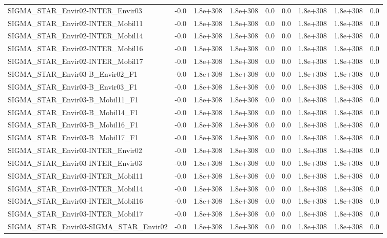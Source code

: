 \begin{tabular}{lrrrrrrrr}
SIGMA_STAR_Envir02-INTER_Envir03 & -0.0 & 1.8e+308 & 1.8e+308 & 0.0 & 0.0 & 1.8e+308 & 1.8e+308 & 0.0 \\
SIGMA_STAR_Envir02-INTER_Mobil11 & -0.0 & 1.8e+308 & 1.8e+308 & 0.0 & 0.0 & 1.8e+308 & 1.8e+308 & 0.0 \\
SIGMA_STAR_Envir02-INTER_Mobil14 & -0.0 & 1.8e+308 & 1.8e+308 & 0.0 & 0.0 & 1.8e+308 & 1.8e+308 & 0.0 \\
SIGMA_STAR_Envir02-INTER_Mobil16 & -0.0 & 1.8e+308 & 1.8e+308 & 0.0 & 0.0 & 1.8e+308 & 1.8e+308 & 0.0 \\
SIGMA_STAR_Envir02-INTER_Mobil17 & -0.0 & 1.8e+308 & 1.8e+308 & 0.0 & 0.0 & 1.8e+308 & 1.8e+308 & 0.0 \\
SIGMA_STAR_Envir03-B_Envir02_F1 & -0.0 & 1.8e+308 & 1.8e+308 & 0.0 & 0.0 & 1.8e+308 & 1.8e+308 & 0.0 \\
SIGMA_STAR_Envir03-B_Envir03_F1 & -0.0 & 1.8e+308 & 1.8e+308 & 0.0 & 0.0 & 1.8e+308 & 1.8e+308 & 0.0 \\
SIGMA_STAR_Envir03-B_Mobil11_F1 & -0.0 & 1.8e+308 & 1.8e+308 & 0.0 & 0.0 & 1.8e+308 & 1.8e+308 & 0.0 \\
SIGMA_STAR_Envir03-B_Mobil14_F1 & -0.0 & 1.8e+308 & 1.8e+308 & 0.0 & 0.0 & 1.8e+308 & 1.8e+308 & 0.0 \\
SIGMA_STAR_Envir03-B_Mobil16_F1 & -0.0 & 1.8e+308 & 1.8e+308 & 0.0 & 0.0 & 1.8e+308 & 1.8e+308 & 0.0 \\
SIGMA_STAR_Envir03-B_Mobil17_F1 & -0.0 & 1.8e+308 & 1.8e+308 & 0.0 & 0.0 & 1.8e+308 & 1.8e+308 & 0.0 \\
SIGMA_STAR_Envir03-INTER_Envir02 & -0.0 & 1.8e+308 & 1.8e+308 & 0.0 & 0.0 & 1.8e+308 & 1.8e+308 & 0.0 \\
SIGMA_STAR_Envir03-INTER_Envir03 & -0.0 & 1.8e+308 & 1.8e+308 & 0.0 & 0.0 & 1.8e+308 & 1.8e+308 & 0.0 \\
SIGMA_STAR_Envir03-INTER_Mobil11 & -0.0 & 1.8e+308 & 1.8e+308 & 0.0 & 0.0 & 1.8e+308 & 1.8e+308 & 0.0 \\
SIGMA_STAR_Envir03-INTER_Mobil14 & -0.0 & 1.8e+308 & 1.8e+308 & 0.0 & 0.0 & 1.8e+308 & 1.8e+308 & 0.0 \\
SIGMA_STAR_Envir03-INTER_Mobil16 & -0.0 & 1.8e+308 & 1.8e+308 & 0.0 & 0.0 & 1.8e+308 & 1.8e+308 & 0.0 \\
SIGMA_STAR_Envir03-INTER_Mobil17 & -0.0 & 1.8e+308 & 1.8e+308 & 0.0 & 0.0 & 1.8e+308 & 1.8e+308 & 0.0 \\
SIGMA_STAR_Envir03-SIGMA_STAR_Envir02 & -0.0 & 1.8e+308 & 1.8e+308 & 0.0 & 0.0 & 1.8e+308 & 1.8e+308 & 0.0 \\

\end{tabular}
